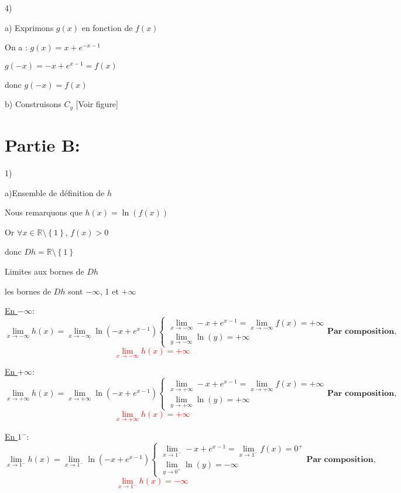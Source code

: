 \documentclass[12pt]{article}
\begin{document}
4)

a) Exprimons $g(x)$ en fonction de $f(x)$

On a : $g(x)=x+e^{-x-1}$

$g(-x)=-x+e^{x-1}=f(x)$

donc $g(-x)=f(x)$

 b) Construisons $C_{g}$ [Voir figure]
 
 \section*{Partie B:}
 1)

	a)Ensemble de définition de $h$

Nous remarquons que 	$h(x)=\ln(f(x))$

Or $\forall x\in \mathbb{R}\setminus\left\lbrace 1\right\rbrace $, $f(x)>0$

donc $Dh=\mathbb{R}\setminus\left\lbrace 1\right\rbrace $

Limites aux bornes de $Dh$

les bornes de $Dh$ sont $-\infty$, 1 et $+\infty$

\underline{En $-\infty$}:
\begin{equation*}
\lim_{x \to -\infty}h(x)=\lim_{x \to -\infty}\ln(-x+e^{x-1})
\begin{cases}
\lim_{x \to -\infty} -x+e^{x-1}=\lim_{x \to -\infty}f(x)=+\infty\\
\lim_{y \to -\infty}\ln(y)=+\infty
\end{cases}
\textbf{Par composition,}
\end{equation*}
\textcolor{red}{\[\lim_{x \to -\infty}h(x)=+\infty\]}

\underline{En $+\infty$}:
\begin{equation*}
\lim_{x \to +\infty}h(x)=\lim_{x \to +\infty}\ln(-x+e^{x-1})
\begin{cases}
\lim_{x \to +\infty} -x+e^{x-1}=\lim_{x \to +\infty}f(x)=+\infty\\
\lim_{y \to +\infty}\ln(y)=+\infty
\end{cases}
\textbf{Par composition,}
\end{equation*}
\textcolor{red}{\[\lim_{x \to +\infty}h(x)=+\infty\]}

\underline{En $1^{-}$}:
\begin{equation*}
\lim_{x \to 1^{-}}h(x)=\lim_{x \to 1^{-}}\ln(-x+e^{x-1})
\begin{cases}
\lim_{x \to 1^{-}} -x+e^{x-1}=\lim_{x \to 1^{-}}f(x)=0^{+}\\
\lim_{y \to 0^{+}}\ln(y)=-\infty
\end{cases}
\textbf{Par composition,}
\end{equation*}
\textcolor{red}{\[\lim_{x \to 1^{-}}h(x)=-\infty\]}
\end{document}
